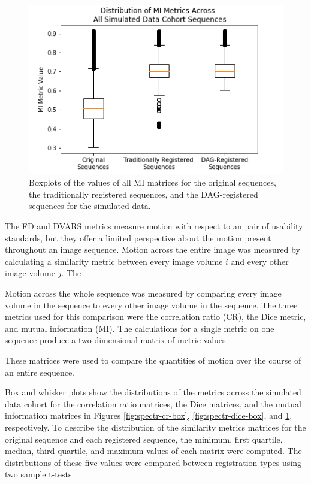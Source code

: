 \begin{figure}
\centering
\includegraphics[height=0.3\textheight]{6/figures/spectr-mi-box.png}
\caption{Boxplots of the values of all MI matrices for the original sequences, the traditionally registered sequences, and the DAG-registered sequences for the simulated data.}
\label{fig:spectr-mi-box}
\end{figure}


The FD and DVARS metrics measure motion with respect to an pair of usability standards, but they offer a limited perspective about the motion present throughout an image sequence. Motion across the entire image was measured by calculating a similarity metric between every image volume $i$ and every other image volume $j$. The 

Motion across the whole sequence was measured by comparing every image volume in the sequence to every other image volume in the sequence. The three metrics used for this comparison were the correlation ratio (CR), the Dice metric, and mutual information (MI). The calculations for a single metric on one sequence produce a two dimensional matrix of metric values. 

These matrices were used to compare the quantities of motion over the course of an entire sequence. 

Box and whisker plots show the distributions of the metrics across the simulated data cohort for the correlation ratio matrices, the Dice matrices, and the mutual information matrices in Figures \ref{fig:spectr-cr-box}, \ref{fig:spectr-dice-box}, and \ref{fig:spectr-mi-box}, respectively. To describe the distribution of the similarity metrics matrices for the original sequence and each registered sequence, the minimum, first quartile, median, third quartile, and maximum values of each matrix were computed. The distributions of these five values were compared between registration types using two sample t-tests. 

